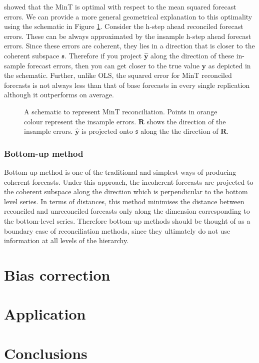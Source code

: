 \documentclass[12pt]{article}
\theoremstyle{definition}
\begin{document}
	\citet{Wickramasuriya2017} showed that the MinT is optimal with respect to the mean squared forecast errors. 
	We can provide a more general geometrical explanation to this optimality using the schematic in Figure \ref{fig:MinT_justification}. Consider the h-step ahead reconciled forecast errors. These can be always approximated by the insample h-step ahead forecast errors. Since these errors are coherent, they lies in a direction that is closer to the coherent subspace $\mathfrak{s}$. Therefore if you project $\hat{\bm{y}}$ along the direction of these in-sample forecast errors, then you can get closer to the true value $\bm{y}$ as depicted in the schematic. Further, unlike OLS, the squared error for MinT reconciled forecasts is not always less than that of base forecasts in every single replication although it outperforms on average.


	 	
	 \begin{figure}[H]
	 		\centering
	 		\small
	 		\resizebox{\linewidth}{!}{
	 			
	 		}
	 		\caption{A schematic to represent MinT reconciliation. Points in orange colour represent the insample errors. $\bm{R}$ shows the direction of the insample errors. $\hat{\bm{y}}$ is projected onto $\mathfrak{s}$ along the the direction of $\bm{R}$.}\label{fig:MinT_justification}
	 \end{figure}
	
	\subsubsection{Bottom-up method}
	
	Bottom-up method is one of the traditional and simplest ways of producing coherent forecasts. Under this approach, the incoherent forecasts are projected to the coherent subspace along the direction which is perpendicular to the bottom level series. In terms of distances, this method minimises the distance between reconciled and unreconciled forecasts only along the dimension corresponding to the bottom-level series. Therefore bottom-up methods should be thought of as a boundary case of reconciliation methods, since they ultimately do not use information at all levels of the hierarchy.   
	
	
	\section{Bias correction}
	
	\section{Application}
	
	\section{Conclusions}
	
	\newpage
	
	
	
	
	
\end{document}
